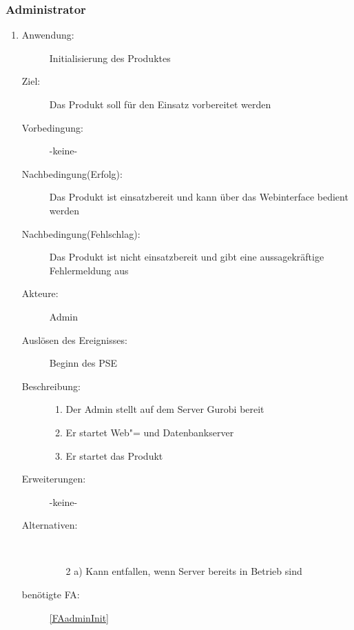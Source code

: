 \documentclass[parskip=full]{scrartcl}
\newcommand{\swtLabel}[1]{\textbf{/#1\arabic*0/}}
\begin{document}
\subsubsection{Administrator}
\begin{enumerate} [label=\swtLabel{A}]
	
	\item \label{UCadminInit}
	\begin{description}
		\item[Anwendung:] Initialisierung des Produktes
		\item[Ziel:] Das Produkt soll für den Einsatz vorbereitet werden
		\item[Vorbedingung:] -keine-
		\item[Nachbedingung(Erfolg):] Das Produkt ist einsatzbereit und kann über das Webinterface bedient werden
		\item[Nachbedingung(Fehlschlag):] Das Produkt ist nicht einsatzbereit und gibt
		eine aussagekräftige Fehlermeldung aus
		\item[Akteure:] \gls{Admin}
		\item[Auslösen des Ereignisses:] Beginn des \gls{PSE}
		\item[Beschreibung:]
		\begin{enumerate} [label=\arabic*.]~
			\item Der \gls{Admin} stellt auf dem Server Gurobi bereit %
			\item Er startet Web"= und Datenbankserver 
			\item Er startet das Produkt
		\end{enumerate}
		\item[Erweiterungen:] -keine-
		\item[Alternativen:]~
		\begin{enumerate}
			\item[2 a)] Kann entfallen, wenn Server bereits in Betrieb sind
		\end{enumerate}
		\item[benötigte FA:] \ref{FAadminInit}
	\end{description}
	

\end{enumerate}
\end{document}
